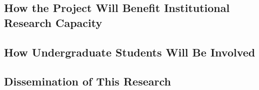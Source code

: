 \subsection{How the Project Will Benefit Institutional Research Capacity}

\lipsum[6]

\subsection{How Undergraduate Students Will Be Involved}

\lipsum[6]


\subsection{Dissemination of This Research}
\lipsum[6]
